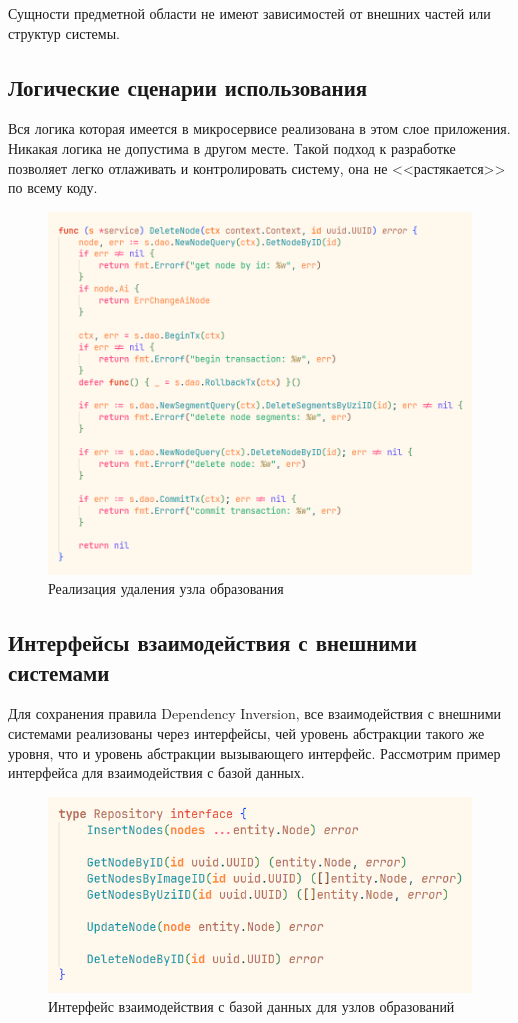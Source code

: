 Сущности предметной области не имеют зависимостей от внешних частей или структур системы.

\subsection{Логические сценарии использования}
Вся логика которая имеется в микросервисе реализована в этом слое приложения. Никакая логика не допустима в другом месте. 
Такой подход к разработке позволяет легко отлаживать и контролировать систему, она не <<растякается>> по всему коду.

\begin{figure}[H]%
	\begin{center}
		\includegraphics[width=.7\columnwidth]{./img/new/logical.png}%
	\end{center}
	\caption{Реализация удаления узла образования}%
	\label{pic:logical}%
\end{figure}

\subsection{Интерфейсы взаимодействия с внешними системами}
Для сохранения правила Dependency Inversion, все взаимодействия с внешними системами реализованы через интерфейсы, чей уровень
абстракции такого же уровня, что и уровень абстракции вызывающего интерфейс. Рассмотрим пример интерфейса для взаимодействия с 
базой данных.

\begin{figure}[H]%
	\begin{center}
		\includegraphics[width=.7\columnwidth]{./img/new/repository.png}%
	\end{center}
	\caption{Интерфейс взаимодействия с базой данных для узлов образований}%
	\label{pic:repository}%
\end{figure}


